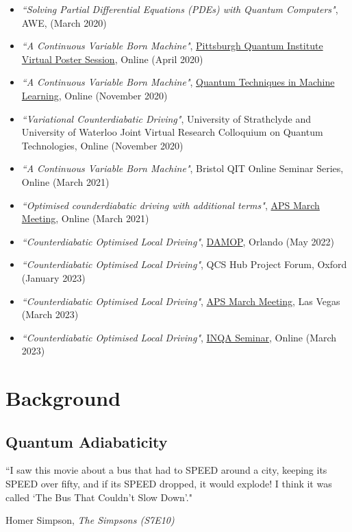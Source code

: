 \documentclass[a4paper,oneside,11pt]{book}
\begin{document}
\begin{itemize}
    \item \textit{``Solving Partial Differential Equations (PDEs) with Quantum Computers"}, AWE, (March 2020)
    \item \textit{``A Continuous Variable Born Machine"}, \href{https://www.youtube.com/live/ImQeEs0BcQs?feature=share&t=1996}{Pittsburgh Quantum Institute Virtual Poster Session}, Online (April 2020)
    \item \textit{``A Continuous Variable Born Machine"}, \href{https://www.youtube.com/watch?v=6v1IiXRToPU&t=3685s}{Quantum Techniques in Machine Learning}, Online (November 2020)
    \item \textit{``Variational Counterdiabatic Driving"}, University of Strathclyde and University of Waterloo Joint Virtual Research Colloquium on Quantum Technologies, Online (November 2020)
    \item \textit{``A Continuous Variable Born Machine"}, Bristol QIT Online Seminar Series, Online (March 2021)
    \item \textit{``Optimised counderdiabatic driving with additional terms"}, \href{https://meetings.aps.org/Meeting/MAR21/Session/S21.8}{APS March Meeting}, Online (March 2021)
    \item \textit{``Counterdiabatic Optimised Local Driving"}, \href{https://www.youtube.com/watch?v=YkoCPIlFl70}{DAMOP}, Orlando (May 2022)
    \item \textit{``Counterdiabatic Optimised Local Driving"}, QCS Hub Project Forum, Oxford (January 2023)
    \item \textit{``Counterdiabatic Optimised Local Driving"}, \href{https://meetings.aps.org/Meeting/MAR23/Session/Q71.8}{APS March Meeting}, Las Vegas (March 2023)
    \item \textit{``Counterdiabatic Optimised Local Driving"}, \href{https://youtu.be/-btmXDNaQX4}{INQA Seminar}, Online (March 2023)
\end{itemize}
\part{Background}\label{part:background}
\chapter{Quantum Adiabaticity}\label{chap:2_adiabaticity}

\epigraph{``I saw this movie about a bus that had to SPEED around a city, keeping its SPEED over fifty, and if its SPEED dropped, it would explode! I think it was called `The Bus That Couldn’t Slow Down'."}{Homer Simpson, \emph{The Simpsons (S7E10)}}
\end{document}
